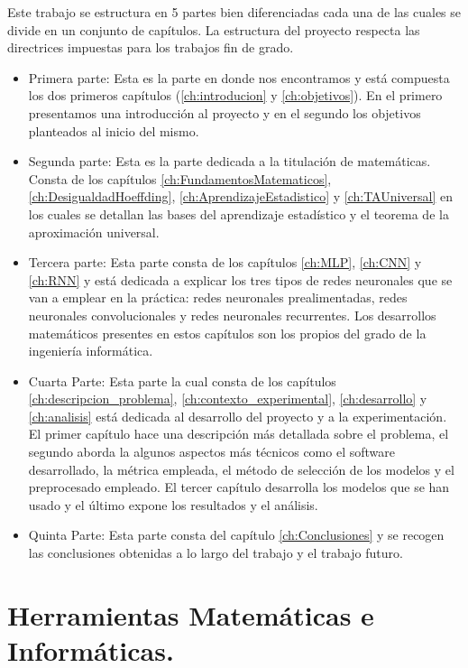     Este trabajo se estructura en 5 partes bien diferenciadas cada una de las cuales se divide en un conjunto de capítulos. La estructura del proyecto respecta las directrices impuestas para los trabajos fin de grado.
    
    \begin{itemize}
        \item Primera parte: Esta es la parte en donde nos encontramos y está compuesta los dos primeros capítulos (\ref{ch:introducion} y \ref{ch:objetivos}). En el primero presentamos una introducción al proyecto y en el segundo los objetivos planteados al inicio del mismo.
        \item Segunda parte: Esta es la parte dedicada a la titulación de matemáticas. Consta de los capítulos \ref{ch:FundamentosMatematicos}, \ref{ch:DesigualdadHoeffding}, \ref{ch:AprendizajeEstadistico} y \ref{ch:TAUniversal} en los cuales se detallan las bases del aprendizaje estadístico y el teorema de la aproximación universal. 
        \item Tercera parte: Esta parte consta de los capítulos \ref{ch:MLP}, \ref{ch:CNN} y \ref{ch:RNN} y está dedicada a explicar los tres tipos de redes neuronales que se van a emplear en la práctica: redes neuronales prealimentadas, redes neuronales convolucionales y redes neuronales recurrentes. Los desarrollos matemáticos presentes en estos capítulos son los propios del grado de la ingeniería informática.
        \item Cuarta Parte: Esta parte la cual consta de los capítulos \ref{ch:descripcion_problema}, \ref{ch:contexto_experimental}, \ref{ch:desarrollo} y \ref{ch:analisis} está dedicada al desarrollo del proyecto y a la experimentación. El primer capítulo hace una descripción más detallada sobre el problema, el segundo aborda la algunos aspectos más técnicos como el software desarrollado, la métrica empleada, el método de selección de los modelos y el preprocesado empleado. El tercer capítulo desarrolla los modelos que se han usado y el último expone los resultados y el análisis.
        \item Quinta Parte: Esta parte consta del capítulo \ref{ch:Conclusiones} y se recogen las conclusiones obtenidas a lo largo del trabajo y el trabajo futuro.
    \end{itemize}
    
    
\section{Herramientas Matemáticas e Informáticas.}

